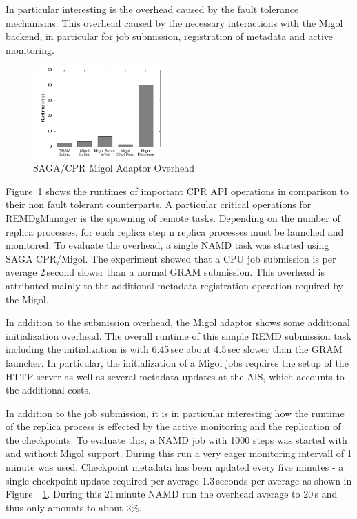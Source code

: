 \documentclass[times, 10pt,twocolumn]{article}
\begin{document}
In particular interesting is the overhead caused by the fault tolerance mechanisms. This overhead 
caused by the necessary interactions with the Migol backend, in particular for 
job submission, registration of metadata and active monitoring.
\begin{figure}[ht]
    \centering
        \includegraphics[width=0.45\textwidth]{performance/perf_submission.pdf}
    \caption{SAGA/CPR Migol Adaptor Overhead}
    \label{fig:performance_perf_submission}
\end{figure}           
Figure~\ref{fig:performance_perf_submission} shows the runtimes of important CPR API operations 
in comparison to their non fault tolerant counterparts. A particular critical operations for 
REMDgManager is the spawning of remote tasks. Depending on the number of replica processes, 
for each replica step n replica processes must be launched and monitored.  To evaluate the 
overhead, a single NAMD task was started using SAGA CPR/Migol.  The experiment showed that a 
CPU job submission is per average 2\,second slower than a normal GRAM submission. This overhead 
is attributed mainly to the additional metadata registration operation required by the Migol. 

In addition to the submission overhead, the Migol adaptor shows some additional initialization 
overhead. The overall runtime of this simple REMD submission task  including the initialization 
is with 6.45\,sec about 4.5\,sec slower than the GRAM launcher. In particular, 
the initialization of a Migol jobs requires the setup of the HTTP server as well as several 
metadata updates at the AIS, which accounts to the additional costs.
                                                                                                                     
In addition to the job submission, it is in particular interesting how the runtime of the 
replica process is effected by the active monitoring and the replication of the checkpoints. 
To evaluate this, a NAMD job with 1000 steps was started with and without Migol support. 
During this run a very eager monitoring intervall of 1 minute was used. Checkpoint metadata has been 
updated every five minutes - a single checkpoint update required per average  1.3\,seconds 
per average as shown in Figure~~\ref{fig:performance_perf_submission}.  During this 21\,minute 
NAMD run the overhead average to 20\,s and thus only amounts to about 2\%. 
                                                                                   
\end{document}
